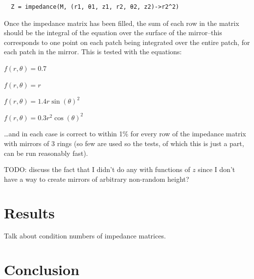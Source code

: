 \documentclass[etd,twoside,senior]{BYUPhys}
\begin{document}
\begin{verbatim}
  Z = impedance(M, (r1, θ1, z1, r2, θ2, z2)->r2^2)
\end{verbatim}

Once the impedance matrix has been filled, the sum of each row in the matrix should be the integral of the equation over the surface of the mirror--this corresponds to one point on each patch being integrated over the entire patch, for each patch in the mirror. This is tested with the equations:

$f\left(r, \theta\right) = 0.7$

$f\left(r, \theta\right) = r$

$f\left(r, \theta\right) = 1.4 r \sin\left(\theta\right)^2$

$f\left(r, \theta\right) = 0.3 r^2 \cos\left(\theta\right)^2$

\ldots and in each case is correct to within 1\% for every row of the impedance matrix with mirrors of 3 rings (so few are used so the tests, of which this is just a part, can be run reasonably fast).

TODO: discuss the fact that I didn't do any with functions of $z$ since I don't have a way to create mirrors of arbitrary non-random height?







\chapter{Results}\label{chap:results}

Talk about condition numbers of impedance matrices.







\chapter{Conclusion}\label{chap:conclusion}
\end{document}
